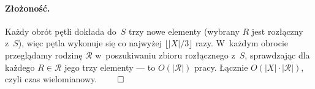 \paragraph{Złożoność.}
Każdy obrót pętli dokłada do~$S$ trzy nowe elementy (wybrany $R$ jest rozłączny
z~$S$), więc pętla wykonuje się co najwyżej $\lfloor |X|/3\rfloor$ razy. W~każdym
obrocie przeglądamy rodzinę $\mathcal{R}$ w~poszukiwaniu zbioru rozłącznego
z~$S$, sprawdzając dla każdego $R\in\mathcal{R}$ jego trzy elementy --- to
$O(|\mathcal{R}|)$ pracy. Łącznie $O(|X|\cdot|\mathcal{R}|)$, czyli czas
wielomianowy. $\qed$
